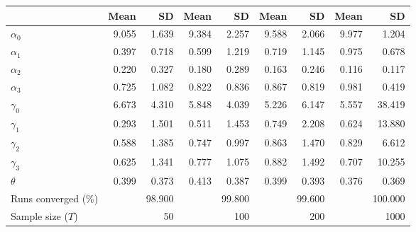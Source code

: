
\begin{tabular}[t]{lrrrrrrrr}
\toprule
  & Mean & SD & Mean  & SD  & Mean   & SD   & Mean    & SD   \\
\midrule
$\alpha_{0}$ & 9.055 & 1.639 & 9.384 & 2.257 & 9.588 & 2.066 & 9.977 & 1.204\\
$\alpha_{1}$ & 0.397 & 0.718 & 0.599 & 1.219 & 0.719 & 1.145 & 0.975 & 0.678\\
$\alpha_{2}$ & 0.220 & 0.327 & 0.180 & 0.289 & 0.163 & 0.246 & 0.116 & 0.117\\
$\alpha_{3}$ & 0.725 & 1.082 & 0.822 & 0.836 & 0.867 & 0.819 & 0.981 & 0.419\\
$\gamma_{0}$ & 6.673 & 4.310 & 5.848 & 4.039 & 5.226 & 6.147 & 5.557 & 38.419\\
$\gamma_{1}$ & 0.293 & 1.501 & 0.511 & 1.453 & 0.749 & 2.208 & 0.624 & 13.880\\
$\gamma_{2}$ & 0.588 & 1.385 & 0.747 & 0.997 & 0.863 & 1.470 & 0.829 & 6.612\\
$\gamma_{3}$ & 0.625 & 1.341 & 0.777 & 1.075 & 0.882 & 1.492 & 0.707 & 10.255\\
$\theta$ & 0.399 & 0.373 & 0.413 & 0.387 & 0.399 & 0.393 & 0.376 & 0.369\\
Runs converged (\%) &  & 98.900 &  & 99.800 &  & 99.600 &  & 100.000\\
Sample size ($T$) &  & 50 &  & 100 &  & 200 &  & 1000\\
\bottomrule
\end{tabular}
